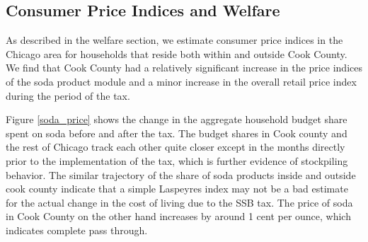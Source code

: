 \documentclass[12pt]{article}
\begin{document}
%

\subsection{Consumer Price Indices and Welfare}

As described in the welfare section, we estimate consumer price indices in the Chicago area for households that reside both within and outside Cook County. We find that Cook County had a relatively significant increase in the price indices of the soda product module and a minor increase in the overall retail price index during the period of the tax.

Figure \ref{soda_price} shows the change in the aggregate household budget  share spent on soda before and after the tax. The budget shares in Cook county and the rest of Chicago track each other quite closer except in the months directly prior to the implementation of the tax, which is further evidence of stockpiling behavior. The similar trajectory of the share of soda products inside and outside cook county indicate that a simple Laspeyres index may not be a bad estimate for the actual change in the cost of living due to the SSB tax. The price of soda in Cook County  on the other hand increases by around 1 cent per ounce, which indicates complete pass through.
\end{document}
